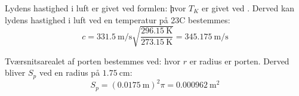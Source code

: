 Lydens hastighed i luft er givet ved formlen: 
\c
hvor $T_{K}$ er givet ved \T. 
Derved kan lydens hastighed i luft ved en temperatur på 23\degree C bestemmes: 
\begin{equation}
		c = {\SI{331,5}{\meter / \second}}
		\sqrt{\frac{\SI{296,15}{\kelvin}}{\SI{273,15}{\kelvin}}} = {\SI{345,175}{\meter / \second}} 	\end{equation}
		
Tværsnitsarealet af porten bestemmes ved: 
\Sp 
hvor ${r}$ er radius er porten. 
Derved bliver $S_{p}$ ved en radius på ${\SI{1.75}{\centi \meter}}$:  
\begin{equation}
S_{p} = ({\SI{0,0175}{\meter}})^{2}\pi = {\SI{0,000962}{\meter^{2}}}	
\end{equation}  





